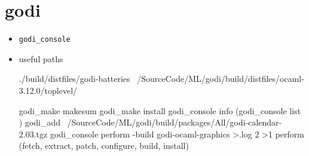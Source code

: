
\section{godi}
\label{sec:godi}
\begin{itemize}
\item \verb|godi_console |

  \item useful paths \\
    

\begin{ocamlcode}
./build/distfiles/godi-batteries
~/SourceCode/ML/godi/build/distfiles/ocaml-3.12.0/toplevel/
\end{ocamlcode}





\begin{ocamlcode}
godi_make makesum
godi_make  install
godi_console info (godi_console list )
godi_add ~/SourceCode/ML/godi/build/packages/All/godi-calendar-2.03.tgz
godi_console perform -build godi-ocaml-graphics  >.log 2 >1
perform (fetch, extract, patch, configure, build, install)
\end{ocamlcode}

  
\end{itemize}

